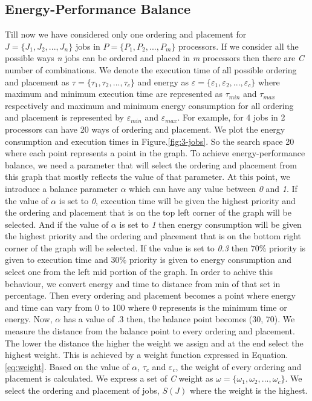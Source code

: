 \subsection{Energy-Performance Balance}
Till now we have considered only one ordering and placement for $J=\{J_1, J_2, ... , J_n\}$ jobs in $P=\{P_1, P_2, ..., P_m\}$
processors. If we consider all the possible ways \emph{n} jobs can be ordered and placed in \emph{m} processors then there
are \emph{C} number of combinations. We denote the execution time of all possible ordering and placement as $\tau=\{\tau_1, \tau_2,
...,\tau_c\}$ and energy as $\varepsilon=\{\varepsilon_1, \varepsilon_2,..., \varepsilon_c\}$ where maximum and minimum execution
time are represented as $\tau_{min}$ and $\tau_{max}$ respectively and maximum and minimum energy consumption for all ordering and
placement is represented by $\varepsilon_{min}$ and $\varepsilon_{max}$.  For example, for 4 jobs in 2 processors can have 20 ways 
of ordering and placement. We plot the energy consumption and execution times in Figure.\ref{fig:3-jobs}. So the search space
 20 where each point represents a point in the graph. To achieve energy-performance balance, we need a parameter 
that will select the ordering and placement from this graph that mostly reflects the value of that parameter. At this point, we 
introduce a balance parameter $\alpha$ which can have any value between \emph{0} and \emph{1}. If the value of $\alpha$ is set 
to \emph{0}, execution time will be given
the highest priority and the ordering and placement that is on the top left corner of the graph will be selected. And if the 
value of $\alpha$ is set to \emph{1} then energy consumption will be given the highest priority and the ordering and placement 
that is on the bottom right corner of the graph will be selected.
If the value is set to \emph{0.3} then $70\%$ priority is given to execution time and $30\%$ priority is given to energy
consumption and select one from the left mid portion of the graph. In order to achive this behaviour, we convert energy and time 
to distance from min of that set in percentage. Then every ordering and placement becomes a point where energy and time can vary 
from 0 to 100 where 0 represents is the minimum time or energy. Now, $\alpha$ has a value of .3 then, the balance point becomes
(30, 70). We measure the distance from the balance point to every ordering and placement. The lower the distance the higher the 
weight we assign and at the end select the highest weight. This is achieved by a weight function expressed 
in Equation.\ref{eq:weight}. Based on the value of $\alpha$,
$\tau_c$ and $\varepsilon_c$, the weight of every ordering and placement is calculated. We express a set of \emph{C} weight as
$\omega=\{\omega_1, \omega_2, ... , \omega_c \}$. We select the ordering and placement of jobs, $S(J)$ where the weight
is the highest.

